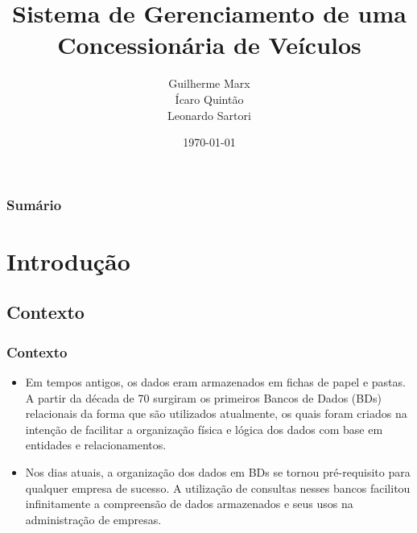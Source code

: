 \documentclass{beamer}
\title[Index]{Sistema de Gerenciamento de uma Concessionária de Veículos} %
\author{Guilherme Marx\\Ícaro Quintão\\Leonardo Sartori } %
\institute[UFOP] %
{
Universidade Federal de Ouro Preto \\ %
\medskip
\textit{guilhermemarx14@gmail.com \\ icarobicalho@hotmail.com \\ sartorileo.ufop@gmail.com} %
}
\date{\today} %
\begin{document}
\begin{frame}
\titlepage %
\end{frame}

\begin{frame}
\frametitle{Sumário} %
\tableofcontents %
\end{frame}


\section{Introdução} %

\subsection{Contexto} %
\begin{frame}
\frametitle{Contexto}

\begin{itemize}
\item Em tempos antigos, os dados eram armazenados em fichas de papel e pastas. A partir da década de 70 surgiram os primeiros Bancos de Dados (BDs) relacionais da forma que são utilizados atualmente, os quais foram criados na intenção de facilitar a organização física e lógica dos dados com base em entidades e relacionamentos. 

\item Nos dias atuais, a organização dos dados em BDs se tornou pré-requisito para qualquer empresa de sucesso. A utilização de consultas nesses bancos facilitou infinitamente a compreensão de dados armazenados e seus usos na administração de empresas.

\end{itemize}
\end{frame}
\end{document}
